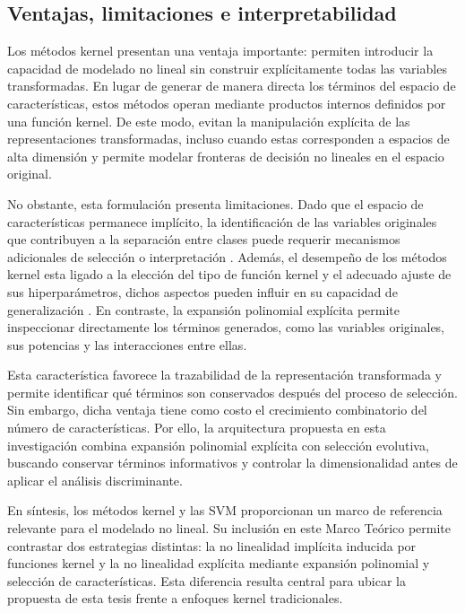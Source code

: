 \subsection{Ventajas, limitaciones e interpretabilidad}

Los métodos kernel presentan una ventaja importante: permiten introducir la capacidad de modelado no lineal sin construir explícitamente todas las variables transformadas. En lugar de generar de manera directa los términos del espacio de características, estos métodos operan mediante productos internos definidos por una función kernel. De este modo, evitan la manipulación explícita de las representaciones transformadas, incluso cuando estas corresponden a espacios de alta dimensión y permite modelar fronteras de decisión no lineales en el espacio original.

No obstante, esta formulación presenta limitaciones. Dado que el espacio de características permanece implícito, la identificación de las variables originales que contribuyen a la separación entre clases puede requerir mecanismos adicionales de selección o interpretación \cite{PARK2021104800}. Además, el desempeño de los métodos kernel esta ligado a la elección del tipo de función kernel y el adecuado ajuste de sus hiperparámetros, dichos aspectos pueden influir en su capacidad de generalización \cite{chapelle2002choosing, rudin2019stop}. En contraste, la expansión polinomial explícita permite inspeccionar directamente los términos generados, como las variables originales, sus potencias y las interacciones entre ellas.

Esta característica favorece la trazabilidad de la representación transformada y permite identificar qué términos son conservados después del proceso de selección. Sin embargo, dicha ventaja tiene como costo el crecimiento combinatorio del número de características. Por ello, la arquitectura propuesta en esta investigación combina expansión polinomial explícita con selección evolutiva, buscando conservar términos informativos y controlar la dimensionalidad antes de aplicar el análisis discriminante.

En síntesis, los métodos kernel y las SVM proporcionan un marco de referencia relevante para el modelado no lineal. Su inclusión en este Marco Teórico permite contrastar dos estrategias distintas: la no linealidad implícita inducida por funciones kernel y la no linealidad explícita mediante expansión polinomial y selección de características. Esta diferencia resulta central para ubicar la propuesta de esta tesis frente a enfoques kernel tradicionales.

